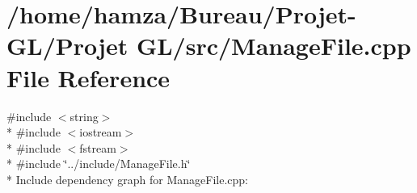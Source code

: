 \section{/home/hamza/\+Bureau/\+Projet-\/\+G\+L/\+Projet G\+L/src/\+Manage\+File.cpp File Reference}
\label{_manage_file_8cpp}
{\ttfamily \#include $<$string$>$}\\*
{\ttfamily \#include $<$iostream$>$}\\*
{\ttfamily \#include $<$fstream$>$}\\*
{\ttfamily \#include \char`\"{}../include/\+Manage\+File.\+h\char`\"{}}\\*
Include dependency graph for Manage\+File.\+cpp\+:
